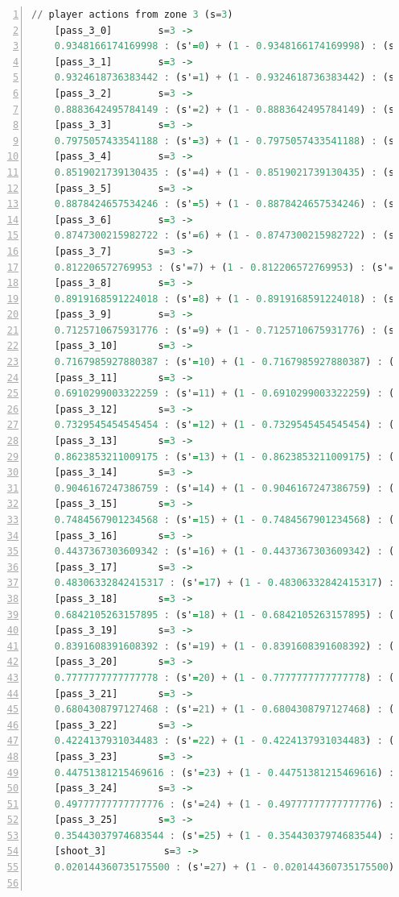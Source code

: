 \documentclass{l4proj}
\begin{document}
\begin{appendices}
\begin{lstlisting}[language=Haskell, numbers=left, caption=MDP used for strategy generation. This is the model specification as-is after the refinements at the end of chapter 3.]
	// player actions from zone 3 (s=3)
	[pass_3_0]	      s=3 ->
	0.9348166174169998 : (s'=0) + (1 - 0.9348166174169998) : (s'=26);
	[pass_3_1]	      s=3 ->
	0.9324618736383442 : (s'=1) + (1 - 0.9324618736383442) : (s'=26);
	[pass_3_2]	      s=3 ->
	0.8883642495784149 : (s'=2) + (1 - 0.8883642495784149) : (s'=26);
	[pass_3_3]	      s=3 ->
	0.7975057433541188 : (s'=3) + (1 - 0.7975057433541188) : (s'=26);
	[pass_3_4]	      s=3 ->
	0.8519021739130435 : (s'=4) + (1 - 0.8519021739130435) : (s'=26);
	[pass_3_5]	      s=3 ->
	0.8878424657534246 : (s'=5) + (1 - 0.8878424657534246) : (s'=26);
	[pass_3_6]	      s=3 ->
	0.8747300215982722 : (s'=6) + (1 - 0.8747300215982722) : (s'=26);
	[pass_3_7]	      s=3 ->
	0.812206572769953 : (s'=7) + (1 - 0.812206572769953) : (s'=26);
	[pass_3_8]	      s=3 ->
	0.8919168591224018 : (s'=8) + (1 - 0.8919168591224018) : (s'=26);
	[pass_3_9]	      s=3 ->
	0.7125710675931776 : (s'=9) + (1 - 0.7125710675931776) : (s'=26);
	[pass_3_10]	      s=3 ->
	0.7167985927880387 : (s'=10) + (1 - 0.7167985927880387) : (s'=26);
	[pass_3_11]	      s=3 ->
	0.6910299003322259 : (s'=11) + (1 - 0.6910299003322259) : (s'=26);
	[pass_3_12]	      s=3 ->
	0.7329545454545454 : (s'=12) + (1 - 0.7329545454545454) : (s'=26);
	[pass_3_13]	      s=3 ->
	0.8623853211009175 : (s'=13) + (1 - 0.8623853211009175) : (s'=26);
	[pass_3_14]	      s=3 ->
	0.9046167247386759 : (s'=14) + (1 - 0.9046167247386759) : (s'=26);
	[pass_3_15]	      s=3 ->
	0.7484567901234568 : (s'=15) + (1 - 0.7484567901234568) : (s'=26);
	[pass_3_16]	      s=3 ->
	0.4437367303609342 : (s'=16) + (1 - 0.4437367303609342) : (s'=26);
	[pass_3_17]	      s=3 ->
	0.48306332842415317 : (s'=17) + (1 - 0.48306332842415317) : (s'=26);
	[pass_3_18]	      s=3 ->
	0.6842105263157895 : (s'=18) + (1 - 0.6842105263157895) : (s'=26);
	[pass_3_19]	      s=3 ->
	0.8391608391608392 : (s'=19) + (1 - 0.8391608391608392) : (s'=26);
	[pass_3_20]	      s=3 ->
	0.7777777777777778 : (s'=20) + (1 - 0.7777777777777778) : (s'=26);
	[pass_3_21]	      s=3 ->
	0.6804308797127468 : (s'=21) + (1 - 0.6804308797127468) : (s'=26);
	[pass_3_22]	      s=3 ->
	0.4224137931034483 : (s'=22) + (1 - 0.4224137931034483) : (s'=26);
	[pass_3_23]	      s=3 ->
	0.44751381215469616 : (s'=23) + (1 - 0.44751381215469616) : (s'=26);
	[pass_3_24]	      s=3 ->
	0.49777777777777776 : (s'=24) + (1 - 0.49777777777777776) : (s'=26);
	[pass_3_25]	      s=3 ->
	0.35443037974683544 : (s'=25) + (1 - 0.35443037974683544) : (s'=26);
	[shoot_3]	       s=3 ->
	0.020144360735175500 : (s'=27) + (1 - 0.020144360735175500) : (s'=26);


\end{lstlisting}
\end{appendices}
\end{document}
